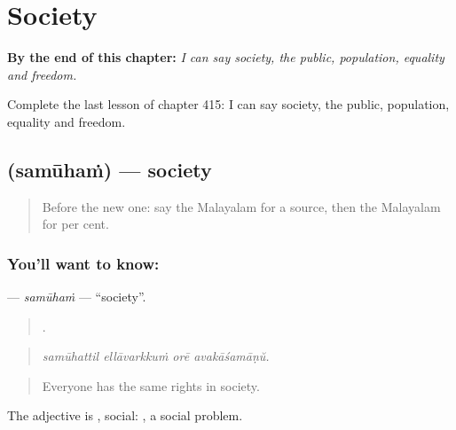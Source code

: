 
\chapter{Society}
\label{ch:ml-society}

\begin{chapteropening}
\textbf{By the end of this chapter:} \emph{I can say society, the public, population, equality and freedom.}

Complete the last lesson of chapter 415: I can say society, the public, population, equality and freedom.
\end{chapteropening}

\section[\texorpdfstring{\ml{സമൂഹം} (samūhaṁ)}{സമൂഹം (samūhaṁ)}]{ (samūhaṁ) — society}

\label{lesson:ML-C415-samuham}



\begin{quote}
Before the new one: say the Malayalam for a source, then the Malayalam for per cent.
\end{quote}

\subsection*{You'll want to know: }
\textbf{} — \emph{samūhaṁ} — \textquotedblleft{}society\textquotedblright{}.

\begin{quote}
   .
\end{quote}

\begin{quote}
\emph{samūhattil ellāvarkkuṁ orē avakāśamāṇŭ.}
\end{quote}

\begin{quote}
Everyone has the same rights in society.
\end{quote}

The adjective is , social:  , a social problem.

